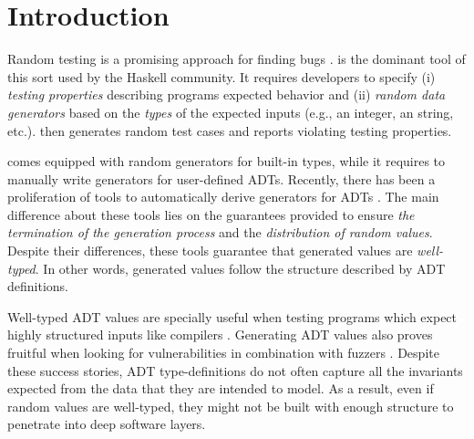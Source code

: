 \section{Introduction}

Random testing is a promising approach for finding bugs
\cite{HughesNSA16,HughesPAN16,ArtsHNS15}.
%
\quickcheck \cite{ClaessenH00} is the dominant tool of this sort used by the
Haskell community.
%
It requires developers to specify (i) \emph{testing properties} describing
programs expected behavior and (ii) \emph{random data generators} based on the
\emph{types} of the expected inputs (e.g., an integer, an string,
etc.). %
%
\quickcheck then generates random test cases and reports violating testing
properties.


\quickcheck comes equipped with random generators for built-in types, while it
requires to manually write generators for user-defined ADTs.
%
Recently, there has been a proliferation of tools to automatically derive
\quickcheck generators for ADTs
\cite{mitchell2007,RuncimanNL08,DuregardJW12,grieco2017,DBLP:conf/haskell/MistaRH18}.
%
The main difference about these tools lies on the guarantees provided to ensure
\emph{the termination of the generation process} and the \emph{distribution of
  random values}.
%
Despite their differences, these tools guarantee that generated values are
\emph{well-typed}.
%
In other words, generated values follow the structure described by ADT
definitions.


Well-typed ADT values are specially useful when testing programs which expect
highly structured inputs like compilers \cite{Palka11,MidtgaardJKNN17}.
%
Generating ADT values also proves fruitful when looking for vulnerabilities in
combination with fuzzers \cite{GriecoCB16,grieco2017}.
%
%
Despite these success stories, ADT type-definitions do not often capture all the
invariants expected from the data that they are intended to model.
%
As a result, even if random values are well-typed, they might not be built with
enough structure to penetrate into deep software layers.


